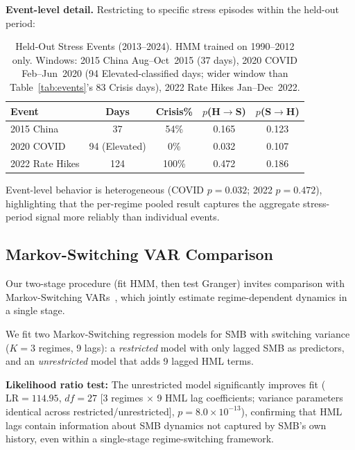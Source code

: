 \documentclass[sigconf,anonymous]{acmart}
\begin{document}
\textbf{Event-level detail.} Restricting to specific stress episodes
within the held-out period:

\begin{table}[t]
\centering
\caption{Held-Out Stress Events (2013--2024). HMM trained on 1990--2012 only.
Windows: 2015 China Aug--Oct~2015 (37 days), 2020 COVID Feb--Jun~2020 (94 Elevated-classified days; wider window than Table~\ref{tab:events}'s 83 Crisis days), 2022 Rate Hikes Jan--Dec~2022.}
\label{tab:frozen_events}
\scriptsize
\begin{tabular}{@{}lcccc@{}}
\toprule
Event & Days & Crisis\% & $p$(H$\to$S) & $p$(S$\to$H) \\
\midrule
2015 China & 37 & 54\% & 0.165 & 0.123 \\
2020 COVID & 94 (Elevated) & 0\% & 0.032 & 0.107 \\
2022 Rate Hikes & 124 & 100\% & 0.472 & 0.186 \\
\bottomrule
\end{tabular}
\end{table}

Event-level behavior is heterogeneous (COVID $p = 0.032$; 2022 $p = 0.472$),
highlighting that the per-regime pooled result captures the aggregate
stress-period signal more reliably than individual events.

\subsection{Markov-Switching VAR Comparison}
\label{sec:msvar}

Our two-stage procedure (fit HMM, then test Granger) invites comparison with
Markov-Switching VARs~\cite{krolzig1997markov,droumaguet2017granger,cavicchioli2025forecasting}, which jointly estimate
regime-dependent dynamics in a single stage.

We fit two Markov-Switching regression models for SMB with switching variance
($K = 3$ regimes, 9 lags): a \emph{restricted} model with only lagged SMB as
predictors, and an \emph{unrestricted} model that adds 9 lagged HML terms.

\textbf{Likelihood ratio test:} The unrestricted model significantly improves fit
($\text{LR} = 114.95$, $df = 27$ [3 regimes $\times$ 9 HML lag coefficients; variance parameters identical across restricted/unrestricted], $p = 8.0 \times 10^{-13}$), confirming that
HML lags contain information about SMB dynamics not captured by SMB's own history,
even within a single-stage regime-switching framework.
\end{document}
